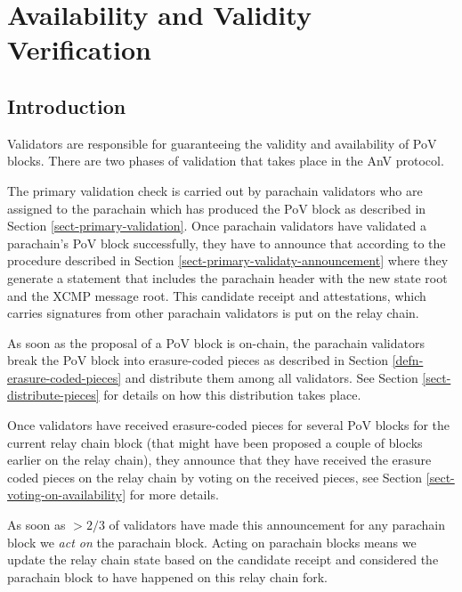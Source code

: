 \chapter{Availability and Validity Verification}

\section{Introduction}

Validators are responsible for guaranteeing the validity and availability of PoV
blocks. There are two phases of validation that takes place in the AnV protocol.
\newline

The primary validation check is carried out by parachain validators who are
assigned to the parachain which has produced the PoV block as described in
Section \ref{sect-primary-validation}. Once parachain validators have validated
a parachain's PoV block successfully, they have to announce that according to
the procedure described in Section \ref{sect-primary-validaty-announcement}
where they generate a statement that includes the parachain header with the new
state root and the XCMP message root. This candidate receipt and attestations,
which carries signatures from other parachain validators is put on the relay
chain.
\newline

As soon as the proposal of a PoV block is on-chain, the parachain validators
break the PoV block into erasure-coded pieces as described in Section
\ref{defn-erasure-coded-pieces} and distribute them among all validators. See
Section \ref{sect-distribute-pieces} for details on how this distribution takes
place.
\newline

Once validators have received erasure-coded pieces for several PoV blocks for
the current relay chain block (that might have been proposed a couple of blocks
earlier on the relay chain), they announce that they have received the erasure
coded pieces on the relay chain by voting on the received pieces, see Section
\ref{sect-voting-on-availability} for more details.
\newline

As soon as $>2/3$ of validators have made this announcement for any parachain
block we \emph{act on} the parachain block. Acting on parachain blocks means we
update the relay chain state based on the candidate receipt and considered the
parachain block to have happened on this relay chain fork.
\newline

